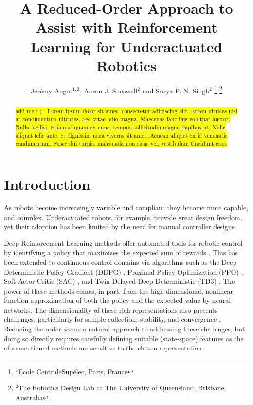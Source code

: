 \documentclass[letterpaper, 10 pt, conference]{ieeeconf}
\title{
    \LARGE \bf%
    A Reduced-Order Approach to Assist with Reinforcement Learning for Underactuated Robotics
}
\author{
    J\'er\'emy Augot$^{1,2}$, Aaron J. Snoswell$^{2}$ and Surya P. N. Singh$^{2}$
    \thanks{
        $^{1}$Ecole CentraleSup\'elec, Paris, France
    }%
    \thanks{
        $^{2}$The Robotics Design Lab at The University of Queensland, Brisbane, Australia
    }%
}
\begin{document}
\maketitle
\thispagestyle{empty}
\pagestyle{empty}

\begin{abstract}

\hl{add me :-) - Lorem ipsum dolor sit amet, consectetur adipiscing elit. Etiam ultrices nisl at condimentum ultricies. Sed vitae odio magna. Maecenas faucibus volutpat auctor. Nulla facilisi. Etiam aliquam ex nunc, tempus sollicitudin magna dapibus ut. Nulla aliquet felis ante, et dignissim urna viverra sit amet. Aenean aliquet ex id venenatis condimentum. Fusce dui turpis, malesuada non risus vel, vestibulum tincidunt eros.}

\end{abstract}

\section{Introduction}

As robots become increasingly variable and compliant they become more capable, and complex.
Underactuated robots, for example, provide great design freedom, yet their adoption has been limited by the need for manual controller designs.

Deep Reinforcement Learning methods offer automated tools for robotic control by identifying a policy that maximizes the expected sum of rewards \cite{henderson2018deep}.
This has been extended to continuous control domains via algorithms such as the Deep Deterministic Policy Gradient (DDPG) \cite{DDPG}, Proximal Policy Optimization (PPO) \cite{PPO}, Soft Actor-Critic (SAC) \cite{SAC}, and Twin Delayed Deep Deterministic (TD3) \cite{TD3}.
The power of these methods comes, in part, from the high-dimensional, nonlinear function approximation of both the policy and the expected value by neural networks.
The dimensionality of these rich representations also presents challenges, particularly for sample collection, stability, and convergence \cite{Islam2017}.
Reducing the order seems a natural approach to addressing these challenges, but doing so directly requires carefully defining suitable (state-space) features as the aforementioned methods are sensitive to the chosen representation \cite{bhatnagar2009convergent}.  
\end{document}
